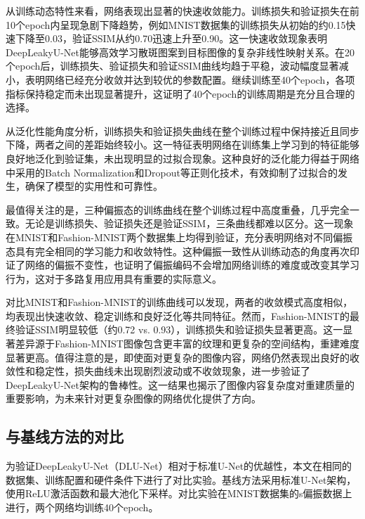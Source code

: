 {从训练动态特性来看，网络表现出显著的快速收敛能力。训练损失和验证损失在前10个epoch内呈现急剧下降趋势，例如MNIST数据集的训练损失从初始的约0.15快速下降至0.03，验证SSIM从约0.70迅速上升至0.90。这一快速收敛现象表明DeepLeakyU-Net能够高效学习散斑图案到目标图像的复杂非线性映射关系。在20个epoch后，训练损失、验证损失和验证SSIM曲线均趋于平稳，波动幅度显著减小，表明网络已经充分收敛并达到较优的参数配置。继续训练至40个epoch，各项指标保持稳定而未出现显著提升，这证明了40个epoch的训练周期是充分且合理的选择。

从泛化性能角度分析，训练损失和验证损失曲线在整个训练过程中保持接近且同步下降，两者之间的差距始终较小。这一特征表明网络在训练集上学习到的特征能够良好地泛化到验证集，未出现明显的过拟合现象。这种良好的泛化能力得益于网络中采用的Batch Normalization和Dropout等正则化技术，有效抑制了过拟合的发生，确保了模型的实用性和可靠性。

最值得关注的是，三种偏振态的训练曲线在整个训练过程中高度重叠，几乎完全一致。无论是训练损失、验证损失还是验证SSIM，三条曲线都难以区分。这一现象在MNIST和Fashion-MNIST两个数据集上均得到验证，充分表明网络对不同偏振态具有完全相同的学习能力和收敛特性。这种偏振一致性从训练动态的角度再次印证了网络的偏振不变性，也证明了偏振编码不会增加网络训练的难度或改变其学习行为，这对于多路复用应用具有重要的实际意义。

对比MNIST和Fashion-MNIST的训练曲线可以发现，两者的收敛模式高度相似，均表现出快速收敛、稳定训练和良好泛化等共同特征。然而，Fashion-MNIST的最终验证SSIM明显较低（约0.72 vs. 0.93），训练损失和验证损失显著更高。这一显著差异源于Fashion-MNIST图像包含更丰富的纹理和更复杂的空间结构，重建难度显著更高。值得注意的是，即使面对更复杂的图像内容，网络仍然表现出良好的收敛性和稳定性，损失曲线未出现剧烈波动或不收敛现象，进一步验证了DeepLeakyU-Net架构的鲁棒性。这一结果也揭示了图像内容复杂度对重建质量的重要影响，为未来针对更复杂图像的网络优化提供了方向。

\subsection{与基线方法的对比}\label{sec:comparison_with_baselines}

为验证DeepLeakyU-Net（DLU-Net）相对于标准U-Net的优越性，本文在相同的数据集、训练配置和硬件条件下进行了对比实验。基线方法采用标准U-Net架构，使用ReLU激活函数和最大池化下采样。对比实验在MNIST数据集的s偏振数据上进行，两个网络均训练40个epoch。

}
